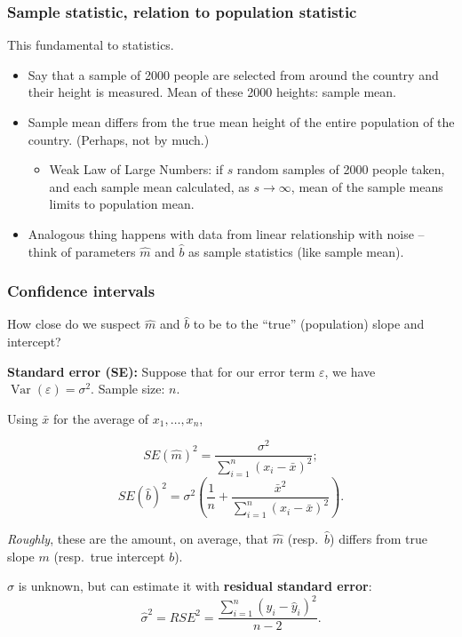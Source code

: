\documentclass{beamer}
\theoremstyle{example}
\begin{document}
\begin{frame}
\frametitle{Sample statistic, relation to population statistic}
This fundamental to statistics. 
\begin{itemize}
    \item Say that a sample of 2000 people are selected from around the country and their height is measured. Mean of these 2000 heights: sample mean.
    \item Sample mean differs from the true mean height of the entire population of the country. (Perhaps, not by much.)
    \begin{itemize}
        \item Weak Law of Large Numbers: if $s$ random samples of 2000 people taken, and each sample mean calculated, as $s\to\infty$, mean of the sample means limits to population mean.
    \end{itemize}

    \item Analogous thing happens with data from linear relationship with noise {--} think of parameters $\hat{m}$ and $\hat{b}$ as sample statistics (like sample mean).
\end{itemize}

\end{frame}

\begin{frame}
\frametitle{Confidence intervals}
How close do we suspect $\hat{m}$ and $\hat{b}$ to be to the ``true'' (population) slope and intercept?

\textbf{Standard error (SE):}  Suppose that for our error term $\varepsilon$, we have $\operatorname{Var}(\varepsilon) = \sigma^2$. Sample size: $n$.

Using $\bar{x}$ for the average of $x_1,\ldots,x_n$,

\[SE(\hat{m})^2 = \frac{\sigma^2}{\sum_{i=1}^n(x_i - \bar{x})^2};\]
\[SE(\hat{b})^2 = \sigma^2\left(\frac1{n} + \frac{\bar{x}^2}{\sum_{i=1}^n(x_i - \bar{x})^2}\right).\]

\emph{Roughly}, these are the amount, on average, that $\hat{m}$ (resp.\ $\hat{b}$) differs from true slope $m$ (resp.\ true intercept $b$).

$\sigma$ is unknown, but can estimate it with \textbf{residual standard error}:
    \[\hat{\sigma}^2 = RSE^2 = \frac{\sum_{i=1}^n(y_i - \hat{y}_i)^2}{n-2}.\]

\end{frame}
\end{document}
